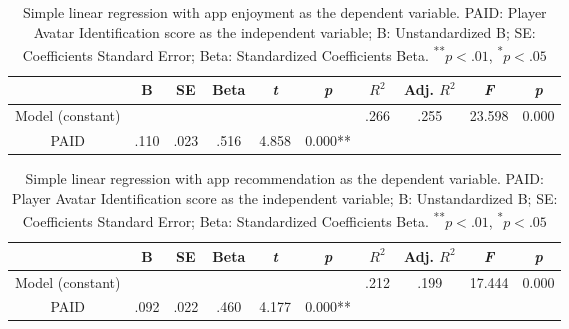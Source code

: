 

\begin{table}
  \caption{Simple linear regression with app enjoyment as the dependent variable. PAID: Player Avatar Identification score as the independent variable; B: Unstandardized B; SE: Coefficients Standard Error; Beta: Standardized Coefficients Beta.
  \textsuperscript{**}$p<.01$, 
  \textsuperscript{*}$p<.05$} 
  \label{tab:appenjoy}
  \begin{tabular}{cccccccccc}
    \toprule
    &B&SE&Beta&\textit{t}&\textit{p}&$R^{2}$&Adj. $R^{2}$&\textit{F}&\textit{p}\\ %
    \midrule                                  
     Model (constant)& &  & &  & &.266&.255&23.598&0.000\\
     PAID&.110 &.023  &.516 &4.858   &0.000**&&&&\\
    \bottomrule
 \end{tabular}
\end{table}

\begin{table}
  \caption{Simple linear regression with app recommendation as the dependent variable. PAID: Player Avatar Identification score as the independent variable; B: Unstandardized B; SE: Coefficients Standard Error; Beta: Standardized Coefficients Beta.
  \textsuperscript{**}$p<.01$, 
  \textsuperscript{*}$p<.05$} 
  \label{tab:apprec}
 \begin{tabular}{cccccccccc}
    \toprule
    &B&SE&Beta&\textit{t}&\textit{p}&$R^{2}$&Adj. $R^{2}$&\textit{F}&\textit{p}\\ %
    \midrule                                  
     Model (constant)& &  & &  & &.212&.199&17.444&0.000\\
     PAID&.092 &.022  &.460 &4.177   &0.000**&&&&\\
    \bottomrule
 \end{tabular}
\end{table}

